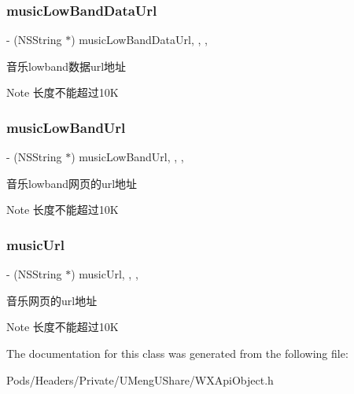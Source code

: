 \subsubsection{\texorpdfstring{music\+Low\+Band\+Data\+Url}{musicLowBandDataUrl}}
{\footnotesize\ttfamily -\/ (N\+S\+String $\ast$) music\+Low\+Band\+Data\+Url\hspace{0.3cm}{\ttfamily [read]}, {\ttfamily [write]}, {\ttfamily [nonatomic]}, {\ttfamily [retain]}}

音乐lowband数据url地址 \begin{DoxyNote}{Note}
长度不能超过10K 
\end{DoxyNote}
\mbox{\label{interface_w_x_music_object_ae5e1fd1ce13de3fe552c9b3c62648d23}} 
\subsubsection{\texorpdfstring{music\+Low\+Band\+Url}{musicLowBandUrl}}
{\footnotesize\ttfamily -\/ (N\+S\+String $\ast$) music\+Low\+Band\+Url\hspace{0.3cm}{\ttfamily [read]}, {\ttfamily [write]}, {\ttfamily [nonatomic]}, {\ttfamily [retain]}}

音乐lowband网页的url地址 \begin{DoxyNote}{Note}
长度不能超过10K 
\end{DoxyNote}
\mbox{\label{interface_w_x_music_object_a0430402fa6325e64c1260d09756c6583}} 
\subsubsection{\texorpdfstring{music\+Url}{musicUrl}}
{\footnotesize\ttfamily -\/ (N\+S\+String $\ast$) music\+Url\hspace{0.3cm}{\ttfamily [read]}, {\ttfamily [write]}, {\ttfamily [nonatomic]}, {\ttfamily [retain]}}

音乐网页的url地址 \begin{DoxyNote}{Note}
长度不能超过10K 
\end{DoxyNote}


The documentation for this class was generated from the following file\+:\begin{DoxyCompactItemize}
\item 
Pods/\+Headers/\+Private/\+U\+Meng\+U\+Share/W\+X\+Api\+Object.\+h\end{DoxyCompactItemize}
